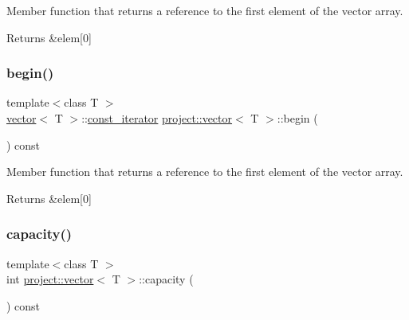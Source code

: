 Member function that returns a reference to the first element of the vector array. 

\begin{DoxyReturn}{Returns}
\&elem\mbox{[}0\mbox{]} 
\end{DoxyReturn}
\mbox{\label{classproject_1_1vector_ac10d2b8ac2cee034dddadc2b7f06b9de}} 
\subsubsection{\texorpdfstring{begin()}{begin()}\hspace{0.1cm}{\footnotesize\ttfamily [2/2]}}
{\footnotesize\ttfamily template$<$class T $>$ \\
\mbox{\hyperlink{classproject_1_1vector}{vector}}$<$ T $>$\+::\mbox{\hyperlink{classproject_1_1vector_ab242a1c8c7abec9b305e502ff7cd0fb2}{const\+\_\+iterator}} \mbox{\hyperlink{classproject_1_1vector}{project\+::vector}}$<$ T $>$\+::begin (\begin{DoxyParamCaption}{ }\end{DoxyParamCaption}) const\hspace{0.3cm}{\ttfamily [inline]}}



Member function that returns a reference to the first element of the vector array. 

\begin{DoxyReturn}{Returns}
\&elem\mbox{[}0\mbox{]} 
\end{DoxyReturn}
\mbox{\label{classproject_1_1vector_a58b02d28811d347a6d0eed40a1d5614b}} 
\subsubsection{\texorpdfstring{capacity()}{capacity()}}
{\footnotesize\ttfamily template$<$class T $>$ \\
int \mbox{\hyperlink{classproject_1_1vector}{project\+::vector}}$<$ T $>$\+::capacity (\begin{DoxyParamCaption}{ }\end{DoxyParamCaption}) const\hspace{0.3cm}{\ttfamily [inline]}}



